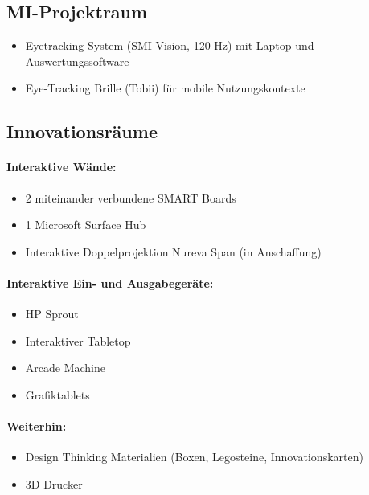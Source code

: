 \subsection{MI-Projektraum}\label{mi-projektraum}

\begin{itemize}
\tightlist
\item
  Eyetracking System (SMI-Vision, 120 Hz) mit Laptop und
  Auswertungssoftware
\item
  Eye-Tracking Brille (Tobii) für mobile Nutzungskontexte
\end{itemize}

\subsection{Innovationsräume}\label{innovationsruxe4ume}

\paragraph{Interaktive Wände:}\label{interaktive-wuxe4nde}

\begin{itemize}
\tightlist
\item
  2 miteinander verbundene SMART Boards
\item
  1 Microsoft Surface Hub
\item
  Interaktive Doppelprojektion Nureva Span (in Anschaffung)
\end{itemize}

\paragraph{Interaktive Ein- und
Ausgabegeräte:}\label{interaktive-ein--und-ausgabegeruxe4te}

\begin{itemize}
\tightlist
\item
  HP Sprout
\item
  Interaktiver Tabletop
\item
  Arcade Machine
\item
  Grafiktablets
\end{itemize}

\paragraph{Weiterhin:}\label{weiterhin}

\begin{itemize}
\tightlist
\item
  Design Thinking Materialien (Boxen, Legosteine, Innovationskarten)
\item
  3D Drucker
\end{itemize}

